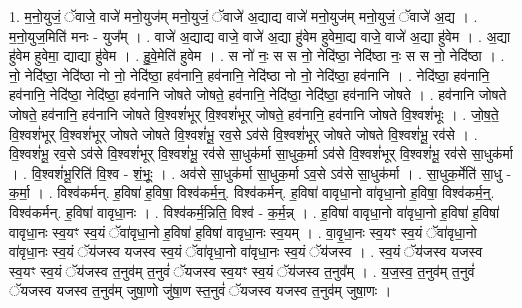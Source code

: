 \documentclass[17pt]{extarticle}
\begin{document}
1. म॒नो॒युजं॒ ॅवाजे॒ वाजे॑ मनो॒युज॑म् मनो॒युजं॒ ॅवाजे॑ अ॒द्याद्य वाजे॑ मनो॒युज॑म् मनो॒युजं॒ ॅवाजे॑ अ॒द्य । . म॒नो॒युज॒मिति॑ मनः - युज᳚म् । . वाजे॑ अ॒द्याद्य वाजे॒ वाजे॑ अ॒द्या हु॑वेम हुवेमा॒द्य वाजे॒ वाजे॑ अ॒द्या हु॑वेम । . अ॒द्या हु॑वेम हुवेमा॒ द्याद्या हु॑वेम । . हु॒वे॒मेति॑ हुवेम । . स नो॑ नः॒ स स नो॒ नेदि॑ष्ठा॒ नेदि॑ष्ठा नः॒ स स नो॒ नेदि॑ष्ठा । . नो॒ नेदि॑ष्ठा॒ नेदि॑ष्ठा नो नो॒ नेदि॑ष्ठा॒ हव॑नानि॒ हव॑नानि॒ नेदि॑ष्ठा नो नो॒ नेदि॑ष्ठा॒ हव॑नानि । . नेदि॑ष्ठा॒ हव॑नानि॒ हव॑नानि॒ नेदि॑ष्ठा॒ नेदि॑ष्ठा॒ हव॑नानि जोषते जोषते॒ हव॑नानि॒ नेदि॑ष्ठा॒ नेदि॑ष्ठा॒ हव॑नानि जोषते । . हव॑नानि जोषते जोषते॒ हव॑नानि॒ हव॑नानि जोषते वि॒श्वशं॑भूर् वि॒श्वशं॑भूर् जोषते॒ हव॑नानि॒ हव॑नानि जोषते वि॒श्वशं॑भूः । . जो॒ष॒ते॒ वि॒श्वशं॑भूर् वि॒श्वशं॑भूर् जोषते जोषते वि॒श्वशं॑भू॒ रव॒से ऽव॑से वि॒श्वशं॑भूर् जोषते जोषते वि॒श्वशं॑भू॒ रव॑से । . वि॒श्वशं॑भू॒ रव॒से ऽव॑से वि॒श्वशं॑भूर् वि॒श्वशं॑भू॒ रव॑से सा॒धुक॑र्मा सा॒धुक॒र्मा ऽव॑से वि॒श्वशं॑भूर् वि॒श्वशं॑भू॒ रव॑से सा॒धुक॑र्मा । . वि॒श्वशं॑भू॒रिति॑ वि॒श्व - शं॒भूः॒ । . अव॑से सा॒धुक॑र्मा सा॒धुक॒र्मा ऽव॒से ऽव॑से सा॒धुक॑र्मा । . सा॒धुक॒र्मेति॑ सा॒धु - क॒र्मा॒ । . विश्व॑कर्मन्. ह॒विषा॑ ह॒विषा॒ विश्व॑कर्म॒न्॒. विश्व॑कर्मन्. ह॒विषा॑ वावृधा॒नो वा॑वृधा॒नो ह॒विषा॒ विश्व॑कर्म॒न्॒. विश्व॑कर्मन्. ह॒विषा॑ वावृधा॒नः । . विश्व॑कर्म॒न्निति॒ विश्व॑ - क॒र्म॒न्न् । . ह॒विषा॑ वावृधा॒नो वा॑वृधा॒नो ह॒विषा॑ ह॒विषा॑ वावृधा॒नः स्व॒यꣳ स्व॒यं ॅवा॑वृधा॒नो ह॒विषा॑ ह॒विषा॑ वावृधा॒नः स्व॒यम् । . वा॒वृ॒धा॒नः स्व॒यꣳ स्व॒यं ॅवा॑वृधा॒नो वा॑वृधा॒नः स्व॒यं ॅय॑जस्व यजस्व स्व॒यं ॅवा॑वृधा॒नो वा॑वृधा॒नः स्व॒यं ॅय॑जस्व । . स्व॒यं ॅय॑जस्व यजस्व स्व॒यꣳ स्व॒यं ॅय॑जस्व त॒नुव॑म् त॒नुवं॑ ॅयजस्व स्व॒यꣳ स्व॒यं ॅय॑जस्व त॒नुव᳚म् । . य॒ज॒स्व॒ त॒नुव॑म् त॒नुवं॑ ॅयजस्व यजस्व त॒नुव॑म् जुषा॒णो जु॑षा॒ण स्त॒नुवं॑ ॅयजस्व यजस्व त॒नुव॑म् जुषा॒णः । \newline
\end{document}
